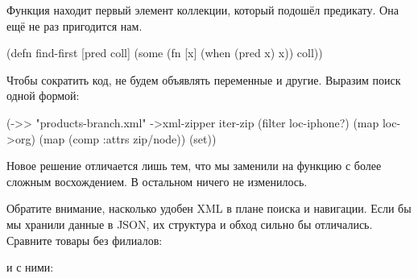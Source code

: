 Функция  находит первый элемент коллекции, который подошёл
предикату. Она ещё не раз пригодится нам.

\begin{english}
  \begin{clojure}
(defn find-first [pred coll]
  (some (fn [x]
          (when (pred x)
            x))
        coll))
  \end{clojure}
\end{english}

Чтобы сократить код, не будем объявлять переменные  и
другие. Выразим поиск одной формой:

\begin{english}
  \begin{clojure}
(->> "products-branch.xml"
     ->xml-zipper
     iter-zip
     (filter loc-iphone?)
     (map loc->org)
     (map (comp :attrs zip/node))
     (set))
  \end{clojure}
\end{english}

Новое решение отличается лишь тем, что мы заменили  на функцию с более
сложным восхождением. В остальном ничего не изменилось.

Обратите внимание, насколько удобен XML в плане поиска и навигации. Если бы мы
хранили данные в JSON, их структура и обход сильно бы отличались. Сравните
товары без филиалов:

\begin{english}
  \begin{json}
  \end{json}
\end{english}

\noindent
и с ними:

\begin{english}
  \begin{json}
  \end{json}
\end{english}

